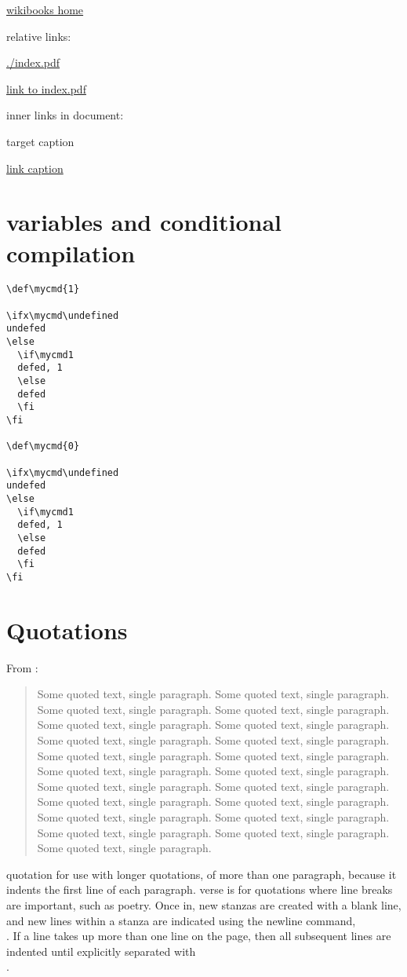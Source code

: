 \documentclass[12pt]{article}
\begin{document}
\href{http://www.wikibooks.org}{wikibooks home}

relative links:

\url{./index.pdf}

\href{./index.pdf}{link to index.pdf}

inner links in document:

\hypertarget{label}{target caption}

\hyperlink{label}{link caption}

\section{variables and conditional compilation}

\begin{lstlisting}
\def\mycmd{1}

\ifx\mycmd\undefined
undefed
\else
  \if\mycmd1
  defed, 1
  \else
  defed
  \fi
\fi

\def\mycmd{0}

\ifx\mycmd\undefined
undefed
\else
  \if\mycmd1
  defed, 1
  \else
  defed
  \fi
\fi
\end{lstlisting}

\section{Quotations}\label{quotations}

From \cite{Aa00}:
\begin{quote}
Some quoted text, single paragraph. Some quoted text, single paragraph. Some quoted text, single paragraph. 
Some quoted text, single paragraph. Some quoted text, single paragraph. Some quoted text, single paragraph. 
Some quoted text, single paragraph. Some quoted text, single paragraph. Some quoted text, single paragraph. 
Some quoted text, single paragraph. Some quoted text, single paragraph. Some quoted text, single paragraph. 
Some quoted text, single paragraph. Some quoted text, single paragraph. Some quoted text, single paragraph. 
Some quoted text, single paragraph. Some quoted text, single paragraph. Some quoted text, single paragraph. 
Some quoted text, single paragraph. Some quoted text, single paragraph. Some quoted text, single paragraph. 
\end{quote}

quotation
    for use with longer quotations, of more than one paragraph, because it indents the first line of each paragraph.
verse
    is for quotations where line breaks are important, such as poetry. Once in, new stanzas are created with a blank line, and new lines within a stanza are indicated using the newline command, \\. If a line takes up more than one line on the page, then all subsequent lines are indented until explicitly separated with \\. 
\end{document}
